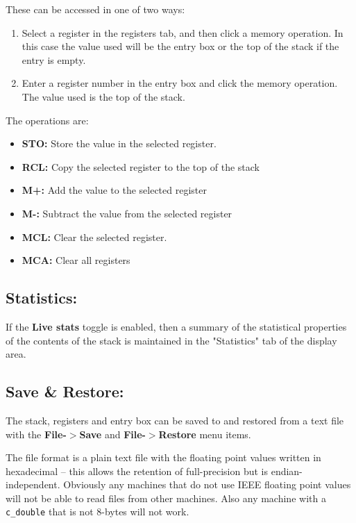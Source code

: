 \documentclass{article}
\begin{document}
  These can be accessed in one of two ways:
  \begin{enumerate}
  \item Select a register in the registers tab, and then click a memory
    operation. In this case the value used will be the entry box or the
    top of the stack if the entry is empty.
  \item Enter a register number in the entry box and click the memory
    operation. The value used is the top of the stack.
  \end{enumerate}

  The operations are:
  \begin{itemize}
  \item \textbf{STO:} Store the value in the selected register.
  \item \textbf{RCL:} Copy the selected register to the top of the
    stack
  \item \textbf{M+:} Add the value to the selected register
  \item \textbf{M-:} Subtract the value from the selected register
  \item \textbf{MCL:} Clear the selected register.
  \item \textbf{MCA:} Clear all registers

  \end{itemize}

  \subsection{Statistics:}

  If the \textbf{Live stats} toggle is enabled, then a summary of the
  statistical properties of the contents of the stack is maintained in
  the "Statistics" tab of the display area. 

  \subsection{Save \& Restore:}

  The stack, registers and entry box can be saved to and restored from
  a text file with the \textbf{File-$>$Save} and
  \textbf{File-$>$Restore} menu items.

  The file format is a plain text file with the floating point values
  written in hexadecimal -- this allows the retention of full-precision
  but is endian-independent. Obviously any machines that do not use
  IEEE floating point values will not be able to read files from other
  machines. Also any machine with a \texttt{c\_double} that is not
  8-bytes will not work.
\end{document}
